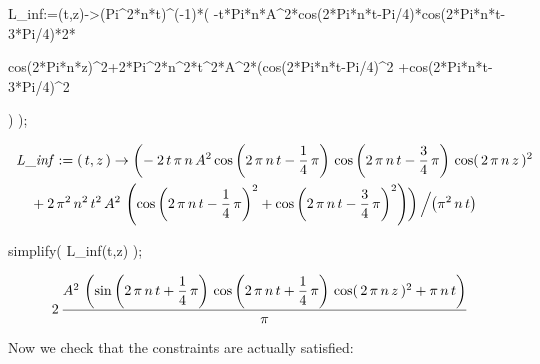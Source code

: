 \begin{mapleinput}
L_inf:=(t,z)->(Pi^2*n*t)^(-1)*( -t*Pi*n*A^2*cos(2*Pi*n*t-Pi/4)*cos(2*Pi*n*t-3*Pi/4)*2*
\end{mapleinput}
\begin{mapleinput}
cos(2*Pi*n*z)^2+2*Pi^2*n^2*t^2*A^2*(cos(2*Pi*n*t-Pi/4)^2 +cos(2*Pi*n*t-3*Pi/4)^2
\end{mapleinput}
\begin{mapleinput}
) );
\end{mapleinput}
\begin{maplelatex}
\begin{eqnarray*}
\lefteqn{{\it L\_inf} := (\,{t}, {z}\,) \rightarrow  \left( 
{\vrule height0.86em width0em depth0.86em} \right. \! \!  - 2\,{t
}\,{ \pi}\,{n}\,{A}^{2}\,{\rm cos} \left( \! \,2\,{ \pi}\,{n}\,{t
} - {\displaystyle \frac {1}{4}}\,{ \pi}\, \!  \right) \,{\rm cos
} \left( \! \,2\,{ \pi}\,{n}\,{t} - {\displaystyle \frac {3}{4}}
\,{ \pi}\, \!  \right) \,{\rm cos}(\,2\,{ \pi}\,{n}\,{z}\,)^{2}}
 \\
 & & \mbox{} + 2\,{ \pi}^{2}\,{n}^{2}\,{t}^{2}\,{A}^{2}\, \left( 
\! \,{\rm cos} \left( \! \,2\,{ \pi}\,{n}\,{t} - {\displaystyle 
\frac {1}{4}}\,{ \pi}\, \!  \right) ^{2} + {\rm cos} \left( \! \,
2\,{ \pi}\,{n}\,{t} - {\displaystyle \frac {3}{4}}\,{ \pi}\, \! 
 \right) ^{2}\, \!  \right)  \! \! \left. {\vrule 
height0.86em width0em depth0.86em} \right)  \left/ {\vrule 
height0.43em width0em depth0.43em} \right. \! \!  \left( \! \,{ 
\pi}^{2}\,{n}\,{t}\, \!  \right) \mbox{\hspace{17pt}}
\end{eqnarray*}
\end{maplelatex}
\begin{mapleinput}
simplify( L_inf(t,z) );
\end{mapleinput}
\begin{maplelatex}
\[
2\,{\displaystyle \frac {{A}^{2}\, \left( \! \,{\rm sin} \left( 
\! \,2\,{ \pi}\,{n}\,{t} + {\displaystyle \frac {1}{4}}\,{ \pi}\,
 \!  \right) \,{\rm cos} \left( \! \,2\,{ \pi}\,{n}\,{t} + 
{\displaystyle \frac {1}{4}}\,{ \pi}\, \!  \right) \,{\rm cos}(\,
2\,{ \pi}\,{n}\,{z}\,)^{2} + { \pi}\,{n}\,{t}\, \!  \right) }{{ 
\pi}}}
\]
\end{maplelatex}
Now we check that the constraints are actually satisfied:


